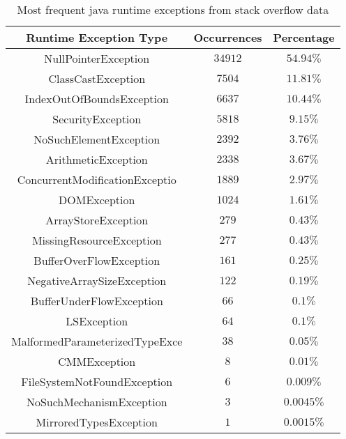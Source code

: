 \begin{table}[h]
\centering
\caption{Most frequent java runtime exceptions from stack overflow data}
\label{tab:stackoverlow}
\begin{tabular}{|c|c|c|}
\hline
\textbf{Runtime Exception Type} & \textbf{Occurrences} & \textbf{Percentage}\\
\hline NullPointerException & $34912$ & $54.94\%$ \\ \hline

ClassCastException & $7504$ & $11.81\%$ \\ \hline

IndexOutOfBoundsException & $6637$ & $10.44\%$ \\ \hline

SecurityException  & $5818$ & $9.15\%$ \\  \hline

NoSuchElementException & $2392$ & $3.76\%$ \\ \hline

ArithmeticException & $2338$ & $3.67\%$ \\ \hline

ConcurrentModificationExceptio & $1889$ & $2.97\%$ \\ \hline

DOMException & $1024$ & $1.61\%$ \\ \hline

ArrayStoreException & $279$ & $0.43\%$ \\ \hline

MissingResourceException & $277$ & $0.43\%$ \\ \hline

BufferOverFlowException & $161$ & $0.25\%$ \\ \hline

NegativeArraySizeException & $122$ & $0.19\%$ \\ \hline

BufferUnderFlowException & $66$ & $0.1\%$ \\ \hline

LSException & $64$ &  $0.1\%$ \\ \hline

MalformedParameterizedTypeExce & $38$ & $0.05\%$ \\ \hline

CMMException  & $8$ & $0.01\%$ \\ \hline

FileSystemNotFoundException & $6$ & $0.009\%$ \\ \hline

NoSuchMechanismException & $3$ & $0.0045\%$ \\ \hline

MirroredTypesException & $1$ & $0.0015\%$ \\ \hline

\end{tabular}
\end{table}

